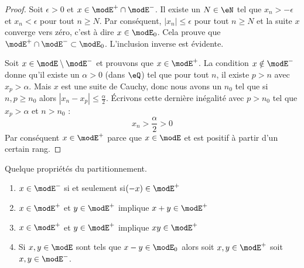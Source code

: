 \begin{proof}
    Soit \( \epsilon>0\) et \( x\in \modE^+\cap\modE^-\). Il existe un \( N\in \eN\) tel que \( x_n>-\epsilon\) et \( x_n<\epsilon\) pour tout \( n\geq N\). Par conséquent, \( | x_n |\leq \epsilon\) pour tout \( n\geq N\) et la suite \( x\) converge vers zéro, c'est à dire \( x\in\modE_0\). Cela prouve que \( \modE^+\cap\modE^-\subset\modE_0\). L'inclusion inverse est évidente.

    Soit \( x\in \modE\setminus\modE^-\) et prouvons que \( x\in\modE^+\). La condition \( x\notin \modE^-\) donne qu'il existe un \( \alpha>0\) (dans \( \eQ\)) tel que pour tout \( n\), il existe \( p>n\) avec \( x_p>\alpha\). Mais \( x\) est une suite de Cauchy, donc nous avons un \( n_0\) tel que si \( n,p\geq n_0\) alors \( | x_n-x_p |\leq \frac{ \alpha }{2}\). Écrivons cette dernière inégalité avec \( p>n_0\) tel que \( x_p>\alpha\) et \( n>n_0\) :
    \begin{equation}
        x_n>\frac{ \alpha }{2}>0
    \end{equation}
    Par conséquent \( x\in\modE^+\) parce que \( x\in\modE\) et est positif à partir d'un certain rang.
\end{proof}

\begin{lemma}
    Quelque propriétés du partitionnement.
    \begin{enumerate}
        \item
            \( x\in\modE^-\) si et seulement si\( (-x)\in\modE^+\)
        \item
            \( x\in\modE^+\) et \( y\in\modE^+\) implique \( x+y\in\modE^+\)
        \item
            \( x\in\modE^+\) et \( y\in\modE^+\) implique \( xy\in\modE^+\)
        \item
            Si \( x,y\in\modE\) sont tels que \( x-y\in\modE_0\) alors soit \( x,y\in\modE^+\) soit \( x,y\in\modE^-\).
    \end{enumerate}
\end{lemma}

